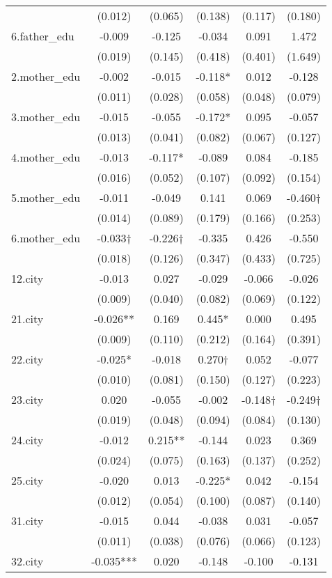 \documentclass[]{article}
\begin{document}
\begin{tabular}{lccccc}
 & (0.012) & (0.065) & (0.138) & (0.117) & (0.180) \\
6.father\_edu & -0.009 & -0.125 & -0.034 & 0.091 & 1.472 \\
 & (0.019) & (0.145) & (0.418) & (0.401) & (1.649) \\
2.mother\_edu & -0.002 & -0.015 & -0.118* & 0.012 & -0.128 \\
 & (0.011) & (0.028) & (0.058) & (0.048) & (0.079) \\
3.mother\_edu & -0.015 & -0.055 & -0.172* & 0.095 & -0.057 \\
 & (0.013) & (0.041) & (0.082) & (0.067) & (0.127) \\
4.mother\_edu & -0.013 & -0.117* & -0.089 & 0.084 & -0.185 \\
 & (0.016) & (0.052) & (0.107) & (0.092) & (0.154) \\
5.mother\_edu & -0.011 & -0.049 & 0.141 & 0.069 & -0.460† \\
 & (0.014) & (0.089) & (0.179) & (0.166) & (0.253) \\
6.mother\_edu & -0.033† & -0.226† & -0.335 & 0.426 & -0.550 \\
 & (0.018) & (0.126) & (0.347) & (0.433) & (0.725) \\
12.city & -0.013 & 0.027 & -0.029 & -0.066 & -0.026 \\
 & (0.009) & (0.040) & (0.082) & (0.069) & (0.122) \\
21.city & -0.026** & 0.169 & 0.445* & 0.000 & 0.495 \\
 & (0.009) & (0.110) & (0.212) & (0.164) & (0.391) \\
22.city & -0.025* & -0.018 & 0.270† & 0.052 & -0.077 \\
 & (0.010) & (0.081) & (0.150) & (0.127) & (0.223) \\
23.city & 0.020 & -0.055 & -0.002 & -0.148† & -0.249† \\
 & (0.019) & (0.048) & (0.094) & (0.084) & (0.130) \\
24.city & -0.012 & 0.215** & -0.144 & 0.023 & 0.369 \\
 & (0.024) & (0.075) & (0.163) & (0.137) & (0.252) \\
25.city & -0.020 & 0.013 & -0.225* & 0.042 & -0.154 \\
 & (0.012) & (0.054) & (0.100) & (0.087) & (0.140) \\
31.city & -0.015 & 0.044 & -0.038 & 0.031 & -0.057 \\
 & (0.011) & (0.038) & (0.076) & (0.066) & (0.123) \\
32.city & -0.035*** & 0.020 & -0.148 & -0.100 & -0.131 \\

\end{tabular}
\end{document}
